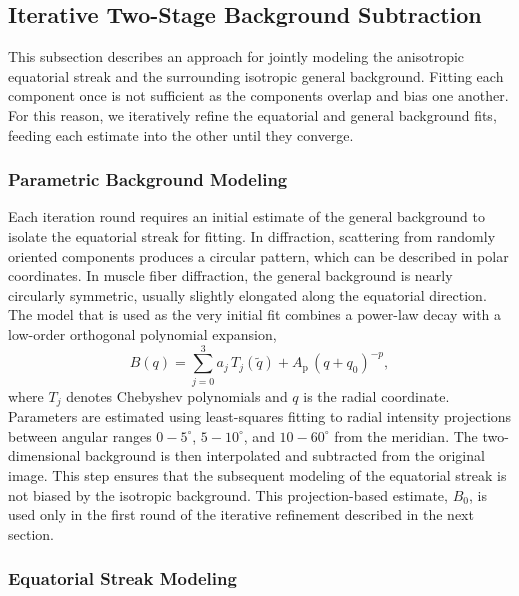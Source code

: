 \documentclass[journal,article,submit,moreauthors]{Definitions/mdpi}
\begin{document}


\subsection{Iterative Two-Stage Background Subtraction}
\label{sec:two_stage}

This subsection describes an approach for jointly modeling the anisotropic equatorial streak and the surrounding isotropic general background. Fitting each component once is not sufficient as the components overlap and bias one another. For this reason, we iteratively refine the equatorial and general background fits, feeding each estimate into the other until they converge.

\subsubsection{Parametric Background Modeling}

Each iteration round requires an initial estimate of the general background to isolate the equatorial streak for fitting. In diffraction, scattering from randomly oriented components produces a circular pattern, which can be described in polar coordinates. In muscle fiber diffraction, the general background is nearly circularly symmetric, usually slightly elongated along the equatorial direction. The model that is used as the very initial fit combines a power-law decay with a low-order orthogonal polynomial expansion,
\begin{equation}
B(q) = \sum_{j=0}^{3} a_j\, T_j(\tilde q) + A_{\mathrm{p}}\, (q + q_0)^{-p},
\end{equation}
where $T_j$ denotes Chebyshev polynomials and $q$ is the radial coordinate. Parameters are estimated using least-squares fitting to radial intensity projections between angular ranges $0-5^{\circ}$, $5-10^{\circ}$, and $10-60^{\circ}$ from the meridian. The two-dimensional background is then interpolated and subtracted from the original image. This step ensures that the subsequent modeling of the equatorial streak is not biased by the isotropic background. This projection-based estimate, $B_0$, is used only in the first round of the iterative refinement described in the next section.

\subsubsection{Equatorial Streak Modeling}
\end{document}
